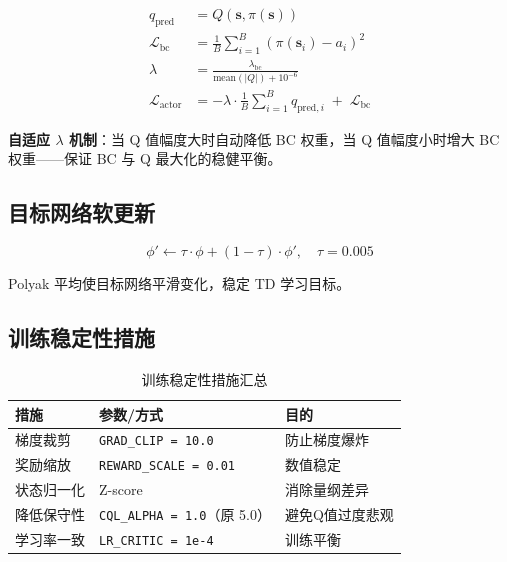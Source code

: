 \documentclass[11pt,a4paper]{ctexart}
\begin{document}
\begin{align}
    q_{\text{pred}} &= Q(\mathbf{s}, \pi(\mathbf{s})) \tag{当前策略Q值} \\
    \mathcal{L}_{\text{bc}} &= \frac{1}{B}\sum_{i=1}^{B} (\pi(\mathbf{s}_i) - a_i)^2 \tag{行为克隆损失} \\
    \lambda &= \frac{\lambda_{\text{bc}}}{\text{mean}(|Q|) + 10^{-6}} \tag{自适应权重} \\
    \mathcal{L}_{\text{actor}} &= -\lambda \cdot \frac{1}{B}\sum_{i=1}^{B} q_{\text{pred},i} \;+\; \mathcal{L}_{\text{bc}} \tag{Actor总损失}
\end{align}

\textbf{自适应 $\lambda$ 机制}：当 Q 值幅度大时自动降低 BC 权重，当 Q 值幅度小时增大 BC 权重——保证 BC 与 Q 最大化的稳健平衡。

\subsection{目标网络软更新}

\begin{equation}
    \phi' \leftarrow \tau \cdot \phi + (1 - \tau) \cdot \phi', \quad \tau = 0.005
\end{equation}

Polyak 平均使目标网络平滑变化，稳定 TD 学习目标。

\subsection{训练稳定性措施}

\begin{table}[H]
\centering
\caption{训练稳定性措施汇总}
\begin{tabular}{lll}
\toprule
\textbf{措施} & \textbf{参数/方式} & \textbf{目的} \\
\midrule
梯度裁剪   & \texttt{GRAD\_CLIP = 10.0}   & 防止梯度爆炸 \\
奖励缩放   & \texttt{REWARD\_SCALE = 0.01} & 数值稳定 \\
状态归一化 & Z-score                  & 消除量纲差异 \\
降低保守性 & \texttt{CQL\_ALPHA = 1.0}（原 5.0） & 避免Q值过度悲观 \\
学习率一致 & \texttt{LR\_CRITIC = 1e-4}   & 训练平衡 \\
\bottomrule
\end{tabular}
\end{table}

\newpage
\end{document}
